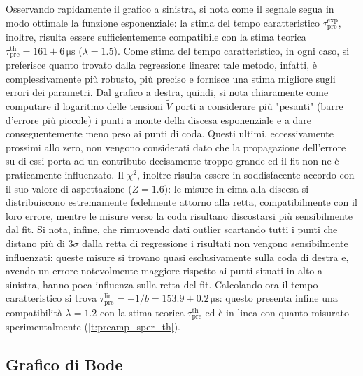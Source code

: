\documentclass[a4paper,11pt]{article} %
\begin{document}
Osservando rapidamente il grafico a sinistra, si nota come il segnale segua in modo ottimale la funzione esponenziale:
la stima del tempo caratteristico $\tau_{\text{pre}}^{\text{exp}}$, inoltre, risulta essere sufficientemente compatibile
con la stima teorica $\tau_{\text{pre}}^{\text{th}} = 161 \pm 6 \,\si{\us}$ ($\lambda = 1.5$). Come stima del tempo
caratteristico, in ogni caso, si preferisce quanto trovato dalla regressione lineare: tale metodo, infatti, è
complessivamente più robusto, più preciso e fornisce una stima migliore sugli errori dei parametri. Dal grafico a
destra, quindi, si nota chiaramente come computare il logaritmo delle tensioni $\tilde{V}$ porti a considerare più
"pesanti" (barre d'errore più piccole) i punti a monte della discesa esponenziale e a dare conseguentemente meno peso ai
punti di coda. Questi ultimi, eccessivamente prossimi allo zero, non vengono considerati dato che la propagazione
dell'errore su di essi porta ad un contributo decisamente troppo grande ed il fit non ne è praticamente influenzato. Il
$\chi^2$, inoltre risulta essere in soddisfacente accordo con il suo valore di aspettazione ($Z = 1.6$): le misure in
cima alla discesa si distribuiscono estremamente fedelmente attorno alla retta, compatibilmente con il loro errore,
mentre le misure verso la coda risultano discostarsi più sensibilmente dal fit. Si nota, infine, che rimuovendo dati
outlier scartando tutti i punti che distano più di $3\sigma$ dalla retta di regressione i risultati non vengono
sensibilmente influenzati: queste misure si trovano quasi esclusivamente sulla coda di destra e, avendo un errore
notevolmente maggiore rispetto ai punti situati in alto a sinistra, hanno poca influenza sulla retta del fit. Calcolando
ora il tempo caratteristico si trova $\tau_{\text{pre}}^{\text{lin}}= -1/b = 153.9 \pm 0.2 \,\si{\us}$: questo presenta
infine una compatibilità $\lambda = 1.2$ con  la stima teorica $\tau_{\text{pre}}^{\text{th}}$ ed è in linea con quanto
misurato sperimentalmente (\autoref{t:preamp_sper_th}).



\subsection{Grafico di Bode}\label{s:preamp_bode}
\end{document}

